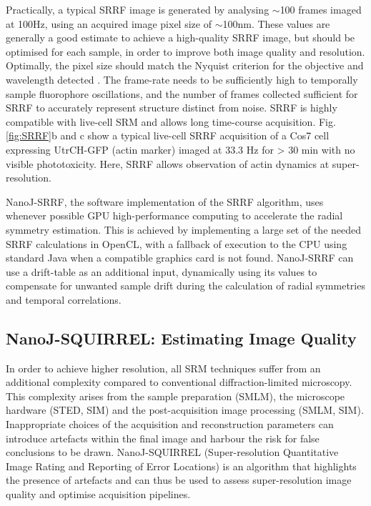  Practically, a typical SRRF image is generated by analysing $\sim$100 frames imaged at 100Hz, using an acquired image pixel size of $\sim$100nm. These values are generally a good estimate to achieve a high-quality SRRF image, but should be optimised for each sample, in order to improve both image quality and resolution. Optimally, the pixel size should match the Nyquist criterion for the objective and wavelength detected \cite{pawley2010handbook}. The frame-rate needs to be sufficiently high to temporally sample fluorophore oscillations, and the number of frames collected sufficient for SRRF to accurately represent structure distinct from noise. SRRF is highly compatible with live-cell SRM and allows long time-course acquisition. Fig.\ref{fig:SRRF}b and c show a typical live-cell SRRF acquisition of a Cos7 cell expressing UtrCH-GFP (actin marker) imaged at 33.3 Hz for > 30 min with no visible phototoxicity. Here, SRRF allows observation of actin dynamics at super-resolution.
 
 NanoJ-SRRF, the software implementation of the SRRF algorithm, uses whenever possible GPU high-performance computing to accelerate the radial symmetry estimation. This is achieved by implementing a large set of the needed SRRF calculations in OpenCL, with a fallback of execution to the CPU using standard Java when a compatible graphics card is not found. NanoJ-SRRF can use a drift-table as an additional input, dynamically using its values to compensate for unwanted sample drift during the calculation of radial symmetries and temporal correlations.

\subsection*{NanoJ-SQUIRREL: Estimating Image Quality}
In order to achieve higher resolution, all SRM techniques suffer from an additional complexity compared to conventional diffraction-limited microscopy. This complexity arises from the sample preparation (SMLM), the microscope hardware (STED, SIM) and the post-acquisition image processing (SMLM, SIM). Inappropriate choices of the acquisition and reconstruction parameters can introduce artefacts within the final image and harbour the risk for false conclusions to be drawn. NanoJ-SQUIRREL (Super-resolution Quantitative Image Rating and Reporting of Error Locations) is an algorithm that highlights the presence of artefacts and can thus be used to assess super-resolution image quality and optimise acquisition pipelines.

